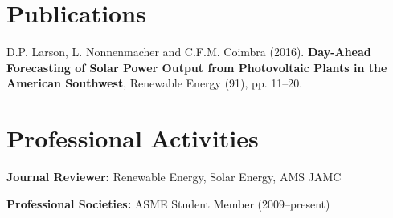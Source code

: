 \documentclass[]{res}
\begin{document}
\begin{resume}
\section{Publications}
\vspace{0.1in}

D.P. Larson, L. Nonnenmacher and C.F.M. Coimbra (2016). \textbf{Day-Ahead Forecasting of Solar Power Output from Photovoltaic Plants in the American Southwest}, Renewable Energy (91), pp. 11--20.


\section{Professional Activities}
\vspace{0.1in}

\textbf{Journal Reviewer:} Renewable Energy, Solar Energy, AMS JAMC

\textbf{Professional Societies:} ASME Student Member (2009--present)



\end{resume}
\end{document}
